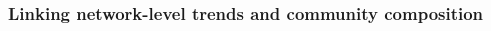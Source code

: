 \documentclass[12pt]{article}
\begin{document}
\begin{spacing}{1.5}




  \subsubsection*{Linking network-level trends and community composition}


\end{spacing}
\end{document}
